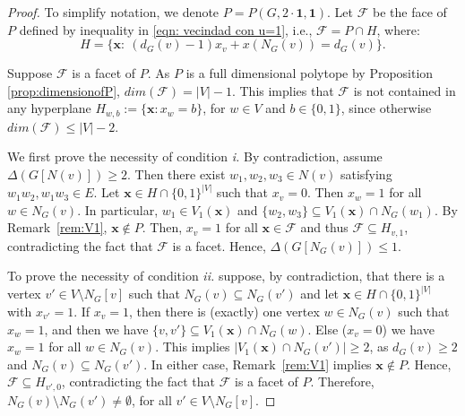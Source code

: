 \documentclass[preprint,12pt]{article}
\renewcommand{\leq}{\leqslant}
\renewcommand{\geq}{\geqslant}
\theoremstyle{definition}
\begin{document}
\begin{proof}
    To simplify notation, we denote $P=P(G,2\cdot\mathbf{1},\mathbf{1})$. Let $\mathcal{F}$ be the face of $P$ defined by  inequality in \eqref{eqn: vecindad con u=1}, i.e., $\mathcal{F}=P\cap H$, where:
    \[H=\{\mathbf{x}:\ (d_G(v)-1)x_v +x(N_G(v)) = d_G(v) \}.\]

    
    Suppose $\mathcal{F}$ is a facet of $P$. As $P$ is a full dimensional polytope by Proposition \ref{prop:dimensionofP}, $dim(\mathcal{F})=|V|-1$. This implies that $\mathcal{F}$ is not contained in any hyperplane $H_{w,b}:=\{\mathbf{x}: x_w=b\}$, for $w\in V$ and $b\in\{0,1\}$, since otherwise $dim(\mathcal{F})\leq |V|-2$.
    
    We first prove the necessity of condition \textit{i.} By contradiction, assume $\Delta(G[N(v)])\geq 2$. Then there exist  $w_1,w_2,w_3\in N(v)$ satisfying 
    $w_1w_2,w_1w_3\in E$. Let $\mathbf{x}\in H\cap \{0,1\}^{|V|}$ such that $x_v=0$. Then $x_w=1$ for all $w\in N_G(v)$. In particular, $w_1\in V_1(\mathbf{x})$ and $\{w_2,w_3\}\subseteq V_1(\mathbf{x})\cap N_G(w_1)$. By Remark~\ref{rem:V1}, $\mathbf{x}\notin P$. Then, $x_v=1$ for all  $\mathbf{x}\in \mathcal{F}$ and thus $\mathcal{F}\subseteq H_{v,1}$, contradicting the fact that $\mathcal{F}$ is a facet. Hence, $\Delta(G[N_G(v)])\leq 1$.

    To prove the necessity of condition \textit{ii.} suppose, by contradiction, that there is a vertex $v'\in V\setminus N_G[v]$ such that $N_G(v)\subseteq N_G(v')$ and let $\mathbf{x}\in H\cap \{0,1\}^{|V|}$ with $x_{v'}=1$. If $x_v=1$, then there is (exactly) one vertex $w\in N_G(v)$ such that $x_w=1$, and then we have $\{v,v'\}\subseteq V_1(\mathbf{x})\cap N_G(w)$. Else ($x_v=0$) we have $x_w=1$ for all $w\in N_G(v)$. This implies $|V_1(\mathbf{x})\cap N_G(v')|\geq 2$, as $d_G(v)\geq 2$ and $N_G(v)\subseteq N_G(v')$. In either case, Remark~\ref{rem:V1} implies $\mathbf{x}\notin P$. Hence, $\mathcal{F}\subseteq H_{v', 0}$, contradicting the fact that $\mathcal{F}$ is a facet of $P$. Therefore, $N_G(v)\setminus N_G(v')\neq \emptyset$, for all $v'\in V\setminus N_G[v]$.


\end{proof}
\end{document}
